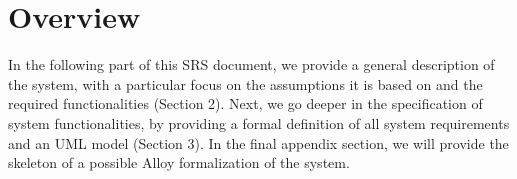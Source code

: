 \section{Overview}
In the following part of this SRS document, we provide a general description of the system, with a particular focus on the assumptions it is based on and the required functionalities (Section 2). Next, we go deeper in the specification of system functionalities, by providing a formal definition of all system requirements and an UML model (Section 3).
In the final appendix section, we will provide the skeleton of a possible Alloy formalization of the system. 

